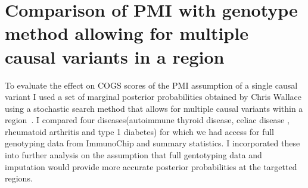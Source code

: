 \documentclass[a4paper,11pt]{report}
\begin{document}
\section{Comparison of PMI with genotype method allowing for multiple causal variants in a region}

To evaluate the effect on COGS scores of the PMI  assumption of a single causal variant I used a set of marginal posterior probabilities obtained by Chris Wallace using a stochastic search method that allows for multiple causal variants within a region~\citep{WallaceCutlerPontikosEtAl2015}. I compared  four diseases(autoimmune thyroid disease, celiac disease , rheumatoid arthritis and type 1 diabetes)   for which we had access for full genotyping data from ImmunoChip and summary statistics. I incorporated these into further analysis on the assumption that full gentotyping data and imputation would provide more accurate posterior probabilities at the targetted regions.




\end{document}

